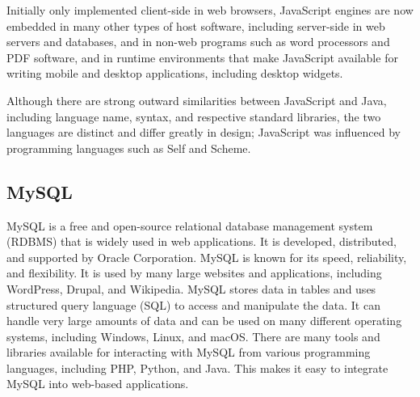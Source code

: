 Initially only implemented client-side in web browsers, JavaScript engines are now embedded in many other types of host software, including server-side in web servers and databases, and in non-web programs such as word processors and PDF software, and in runtime environments that make JavaScript available for writing mobile and desktop applications, including desktop widgets.

Although there are strong outward similarities between JavaScript and Java, including language name, syntax, and respective standard libraries, the two languages are distinct and differ greatly in design; JavaScript was influenced by programming languages such as Self and Scheme.

\subsection{MySQL}
MySQL is a free and open-source relational database management system (RDBMS) that is widely used in web applications. It is developed, distributed, and supported by Oracle Corporation.
MySQL is known for its speed, reliability, and flexibility. It is used by many large websites and applications, including WordPress, Drupal, and Wikipedia.
MySQL stores data in tables and uses structured query language (SQL) to access and manipulate the data. It can handle very large amounts of data and can be used on many different operating systems, including Windows, Linux, and macOS.
There are many tools and libraries available for interacting with MySQL from various programming languages, including PHP, Python, and Java. This makes it easy to integrate MySQL into web-based applications.